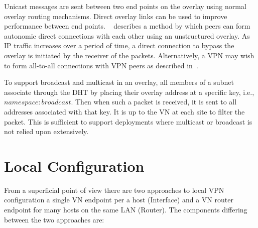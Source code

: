 Unicast messages are sent between two end points on the overlay using normal
overlay routing mechanisms.  Direct overlay links can be used to improve
performance between end points.  ~\cite{ipop} describes a method by which peers
can form autonomic direct connections with each other using an unstructured
overlay.  As IP traffic increases over a period of time, a direct connection to
bypass the overlay is initiated by the receiver of the packets.  Alternatively,
a VPN may wish to form all-to-all connections with VPN peers as described
in~\cite{cops08}.

To support broadcast and multicast in an overlay, all members of a subnet
associate through the DHT by placing their overlay address at a specific key,
i.e., $namespace:broadcast$.  Then when such a packet is received, it is sent
to all addresses associated with that key.  It is up to the VN at each site to
filter the packet.  This is sufficient to support deployments where multicast
or broadcast is not relied upon extensively.  

\section{Local Configuration}
From a superficial point of view there are two approaches to local VPN
configuration a single VN endpoint per a host (Interface) and a VN router
endpoint for many hosts on the same LAN (Router).  The components differing
between the two approaches are:

